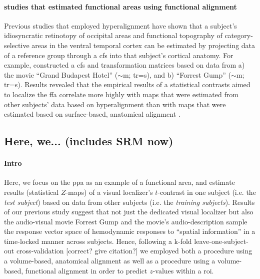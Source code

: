 \paragraph{studies that estimated functional areas using functional alignment}

Previous studies \citep{jiahui2020predicting, guntupalli2016model,
haxby2011common} that employed hyperalignment have shown that a subject's
idiosyncratic retinotopy of occipital areas and functional topography of
category-selective areas in the ventral temporal cortex can be estimated by
projecting data of a reference group through a \ac{cfs} into that subject's
cortical anatomy.
For example, \citep{jiahui2020predicting} constructed a \ac{cfs} and
transformation matrices based on data from a) the movie ``Grand Budapest Hotel''
($\sim$\unit[50]{m}; \ac{tr}=\unit[1]{s}), and b) ``Forrest Gump''
($\sim$\unit[120]{m}; \ac{tr}=\unit[2]{s}).
Results revealed that the empirical results of a statistical contrasts aimed to
localize the \ac{ffa} correlate more highly with maps that were estimated from
other subjects' data based on hyperalignment than with maps that were estimated
based on surface-based, anatomical alignment \citep{jiahui2020predicting}.


\subsection{Here, we... (includes SRM now)}


\paragraph{Intro}

Here, we focus on the \ac{ppa} as an example of a functional area, and estimate
results (statistical $Z$-maps) of a visual localizer's $t$-contrast in one
subject (i.e. the \textit{test subject}) based on data from other subjects (i.e.
the \textit{training subjects}).
%
Results of our previous study \citep{haeusler2022processing} suggest that not
just the dedicated visual localizer \citep{sengupta2016extension} but also the
audio-visual movie Forrest Gump \citep{hanke2016simultaneous} and the movie's
audio-description \citep{hanke2014audiomovie} sample the response vector space
of hemodynamic responses to ``spatial information'' in a time-locked manner
across subjects.
%
Hence, following a k-fold leave-one-subject-out cross-validation [correct? give
citation?] we employed both a procedure using a volume-based, anatomical
alignment as well as a procedure using a volume-based, functional alignment in
order to predict $z$-values within a \ac{roi}.

